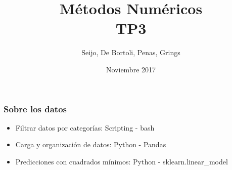 \documentclass{beamer}
\title[TP3]{Métodos Numéricos \\ TP3} %
\author{Seijo, De Bortoli, Penas, Grings} %
\institute[DC] %
{
}
\date{Noviembre 2017} %
\begin{document}
\begin{frame}
\titlepage %
\end{frame}






\begin{frame}






\frametitle{Sobre los datos}
\begin{itemize}
    \item{Filtrar datos por categorías: Scripting - bash}
    \item{Carga y organización de datos: Python - Pandas}
    \item{Predicciones con cuadrados mínimos: Python - sklearn.linear\_model}
\end{itemize}

\end{frame}
\end{document}
